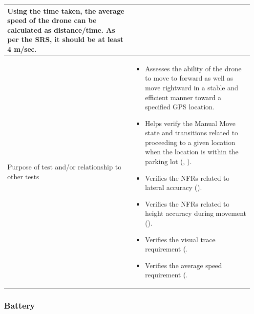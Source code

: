 \documentclass[12pt, titlepage]{article}
\begin{document}
\begin{table}[!h]
\begin{center}
\begin{tabular}{ | m{3.2cm} | m{12.2cm} | }
Using the time taken, the average speed of the drone can be calculated as distance/time. As per the SRS, it should be at least 4 m/sec. 
 \\ 
\hline
Purpose of test and/or relationship to other tests & 
\begin{itemize}
    \item Assesses the ability of the drone to move to forward as well as move rightward in a stable and efficient manner toward a specified GPS location.
    \item Helps verify the Manual Move state and transitions related to proceeding to a given location when the location is within the parking lot (\nameref{STA_002}, \nameref{TRANS_005}).
    \item Verifies the NFRs related to lateral accuracy (\nameref{PERF_008}). 
    \item Verifies the NFRs related to height accuracy during movement (\nameref{PERF_006}). 
    \item Verifies the visual trace requirement (\nameref{USE_001}. 
    \item Verifies the average speed requirement (\nameref{PERF_003}. 
\end{itemize}
\\ 
\hline
\end{tabular}
\end{center}
\end{table}

\clearpage

\subsubsection{Battery}
\end{document}
